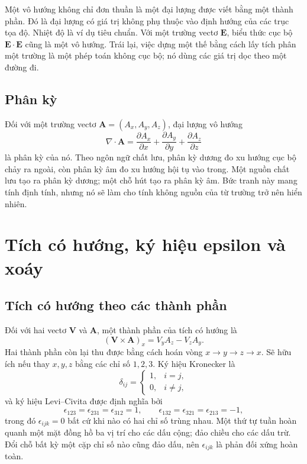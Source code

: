 Một vô hướng không chỉ đơn thuần là một đại lượng được viết bằng một thành phần. Đó là đại lượng có giá trị không phụ thuộc vào định hướng của các trục tọa độ. Nhiệt độ là ví dụ tiêu chuẩn. Với một trường vectơ \(\mathbf E\), biểu thức cục bộ \(\mathbf E\cdot\mathbf E\) cũng là một vô hướng. Trái lại, việc dựng một thế bằng cách lấy tích phân một trường là một phép toán không cục bộ; nó dùng các giá trị dọc theo một đường đi.

\subsection{Phân kỳ}

Đối với một trường vectơ \(\mathbf A=(A_x,A_y,A_z)\), đại lượng vô hướng
\begin{equation}
  \nabla\cdot\mathbf A
  =
  \frac{\partial A_x}{\partial x}
  +\frac{\partial A_y}{\partial y}
  +\frac{\partial A_z}{\partial z}
\end{equation}
là phân kỳ của nó. Theo ngôn ngữ chất lưu, phân kỳ dương đo xu hướng cục bộ chảy ra ngoài, còn phân kỳ âm đo xu hướng hội tụ vào trong. Một nguồn chất lưu tạo ra phân kỳ dương; một chỗ hút tạo ra phân kỳ âm. Bức tranh này mang tính định tính, nhưng nó sẽ làm cho tính không nguồn của từ trường trở nên hiển nhiên.

\section{Tích có hướng, ký hiệu epsilon và xoáy}

\subsection{Tích có hướng theo các thành phần}

Đối với hai vectơ \(\mathbf V\) và \(\mathbf A\), một thành phần của tích có hướng là
\begin{equation}
  (\mathbf V\times\mathbf A)_x
  =
  V_yA_z-V_zA_y.
\end{equation}
Hai thành phần còn lại thu được bằng cách hoán vòng \(x\to y\to z\to x\). Sẽ hữu ích nếu thay \(x,y,z\) bằng các chỉ số \(1,2,3\). Ký hiệu Kronecker là
\begin{equation}
  \delta_{ij}
  =
  \begin{cases}
    1,&i=j,\\
    0,&i\ne j,
  \end{cases}
\end{equation}
và ký hiệu Levi--Civita được định nghĩa bởi
\begin{equation}
  \epsilon_{123}=\epsilon_{231}=\epsilon_{312}=1,
  \qquad
  \epsilon_{132}=\epsilon_{321}=\epsilon_{213}=-1,
\end{equation}
trong đó \(\epsilon_{ijk}=0\) bất cứ khi nào có hai chỉ số trùng nhau. Một thứ tự tuần hoàn quanh một mặt đồng hồ ba vị trí cho các dấu cộng; đảo chiều cho các dấu trừ. Đổi chỗ bất kỳ một cặp chỉ số nào cũng đảo dấu, nên \(\epsilon_{ijk}\) là phản đối xứng hoàn toàn.

